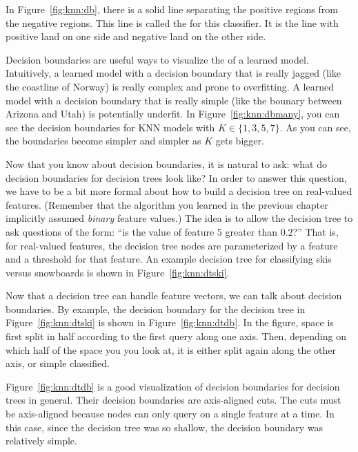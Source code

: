 In Figure~\ref{fig:knn:db}, there is a solid line separating the positive
regions from the negative regions.  This line is called the
 for this classifier.  It is the line with
positive land on one side and negative land on the other side.


Decision boundaries are useful ways to visualize the
 of a learned model.  Intuitively, a learned model
with a decision boundary that is really jagged (like the coastline of
Norway) is really complex and prone to overfitting.  A learned model
with a decision boundary that is really simple (like the bounary
between Arizona and Utah) is potentially underfit.  In
Figure~\ref{fig:knn:dbmany}, you can see the decision boundaries for KNN
models with $K \in \{1, 3, 5, 7\}$.  As you can see, the boundaries
become simpler and simpler as $K$ gets bigger.


Now that you know about decision boundaries, it is natural to ask:
what do decision boundaries for decision trees look like?  In order to
answer this question, we have to be a bit more formal about how to
build a decision tree on real-valued features.  (Remember that the
algorithm you learned in the previous chapter implicitly assumed
\emph{binary} feature values.)  The idea is to allow the decision tree
to ask questions of the form: ``is the value of feature $5$ greater
than $0.2$?''  That is, for real-valued features, the decision tree
nodes are parameterized by a feature and a threshold for that
feature.  An example decision tree for classifying skis versus
snowboards is shown in Figure~\ref{fig:knn:dtski}.


Now that a decision tree can handle feature vectors, we can talk about
decision boundaries.  By example, the decision boundary for the
decision tree in Figure~\ref{fig:knn:dtski} is shown in
Figure~\ref{fig:knn:dtdb}.  In the figure, space is first split in half
according to the first query along one axis.  Then, depending on which
half of the space you you look at, it is either split again along the
other axis, or simple classified.


Figure~\ref{fig:knn:dtdb} is a good visualization of decision boundaries
for decision trees in general.  Their decision boundaries are
axis-aligned cuts.  The cuts must be axis-aligned because nodes can
only query on a single feature at a time.  In this case, since the
decision tree was so shallow, the decision boundary was relatively
simple.  

